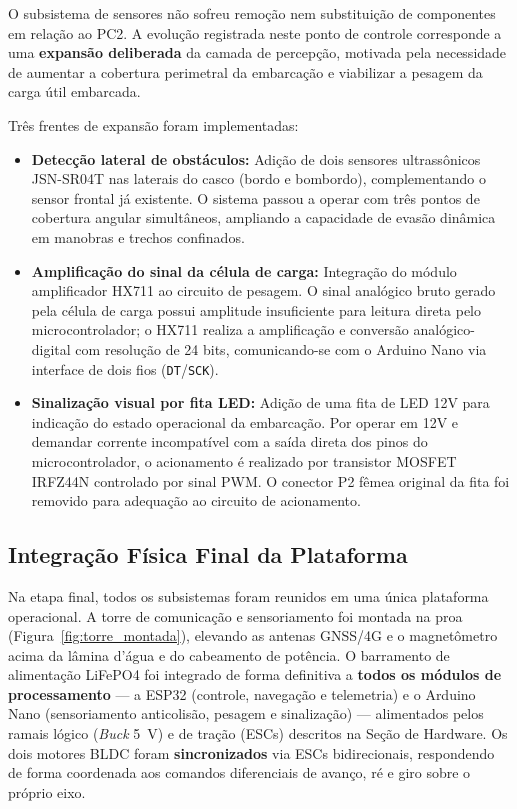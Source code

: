 \documentclass[12pt,a4paper]{article}
\begin{document}
O subsistema de sensores não sofreu remoção nem substituição de componentes em relação ao PC2. A evolução registrada neste ponto de controle corresponde a uma \textbf{expansão deliberada} da camada de percepção, motivada pela necessidade de aumentar a cobertura perimetral da embarcação e viabilizar a pesagem da carga útil embarcada.

Três frentes de expansão foram implementadas:

\begin{itemize} 
    \item \textbf{Detecção lateral de obstáculos:} Adição de dois sensores ultrassônicos JSN-SR04T nas laterais do casco (bordo e bombordo), complementando o sensor frontal já existente. O sistema passou a operar com três pontos de cobertura angular simultâneos, ampliando a capacidade de evasão dinâmica em manobras e trechos confinados.

    \item \textbf{Amplificação do sinal da célula de carga:} Integração do módulo amplificador HX711 ao circuito de pesagem. O sinal analógico bruto gerado pela célula de carga possui amplitude insuficiente para leitura direta pelo microcontrolador; o HX711 realiza a amplificação e conversão analógico-digital com resolução de 24 bits, comunicando-se com o Arduino Nano via interface de dois fios (\texttt{DT}/\texttt{SCK}).

    \item \textbf{Sinalização visual por fita LED:} Adição de uma fita de LED 12V para indicação do estado operacional da embarcação. Por operar em 12V e demandar corrente incompatível com a saída direta dos pinos do microcontrolador, o acionamento é realizado por transistor MOSFET IRFZ44N controlado por sinal PWM. O conector P2 fêmea original da fita foi removido para adequação ao circuito de acionamento.
\end{itemize}


\subsection{Integração Física Final da Plataforma}

Na etapa final, todos os subsistemas foram reunidos em uma única plataforma operacional. A torre de comunicação e sensoriamento foi montada na proa (Figura~\ref{fig:torre_montada}), elevando as antenas GNSS/4G e o magnetômetro acima da lâmina d'água e do cabeamento de potência. O barramento de alimentação LiFePO4 foi integrado de forma definitiva a \textbf{todos os módulos de processamento} — a ESP32 (controle, navegação e telemetria) e o Arduino Nano (sensoriamento anticolisão, pesagem e sinalização) — alimentados pelos ramais lógico (\textit{Buck} 5~V) e de tração (ESCs) descritos na Seção de Hardware. Os dois motores BLDC foram \textbf{sincronizados} via ESCs bidirecionais, respondendo de forma coordenada aos comandos diferenciais de avanço, ré e giro sobre o próprio eixo.
\end{document}
